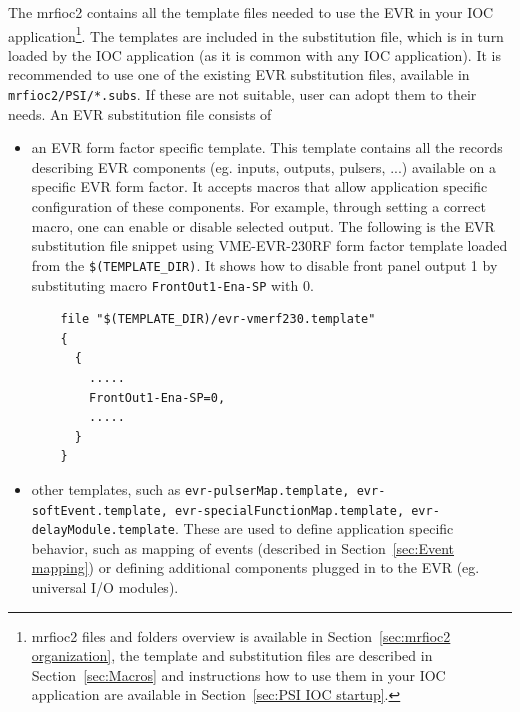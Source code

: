 \documentclass[12pt,a4paper]{article}
\begin{document}
The mrfioc2 contains all the template files needed to use the EVR in your IOC application\footnote{mrfioc2 files and folders overview is available in Section~\ref{sec:mrfioc2 organization}, the template and substitution files are described in Section~\ref{sec:Macros} and instructions how to use them in your IOC application are available in Section~\ref{sec:PSI IOC startup}.}. The templates are included in the substitution file, which is in turn loaded by the IOC application (as it is common with any IOC application). 
It is recommended to use one of the existing EVR substitution files, available in \texttt{mrfioc2/PSI/*.subs}. If these are not suitable, user can adopt them to their needs.
An EVR substitution file consists of
\begin{itemize}
	\item an EVR form factor specific template. This template contains all the records describing EVR components (eg. inputs, outputs, pulsers, ...) available on a specific EVR form factor. It accepts macros that allow application specific configuration of these components. For example, through setting a correct macro, one can enable or disable selected output. The following is the EVR substitution file snippet using VME-EVR-230RF form factor template loaded from the \texttt{\$(TEMPLATE\_DIR)}. It shows how to disable front panel output 1 by substituting macro \texttt{FrontOut1-Ena-SP} with 0.
	\begin{verbatim}
	file "$(TEMPLATE_DIR)/evr-vmerf230.template"
	{
	  {
	    .....
	    FrontOut1-Ena-SP=0,
	    .....
	  }
	}
	\end{verbatim}
	\item other templates, such as \texttt{evr-pulserMap.template, evr-softEvent.template, evr-specialFunctionMap.template, evr-delayModule.template}. These are used to define application specific behavior, such as mapping of events (described in Section~\ref{sec:Event mapping}) or defining additional components plugged in to the EVR (eg. universal I/O modules). 
\end{itemize}
\end{document}
